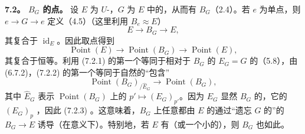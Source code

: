 \textbf{7.2。 $B_G$ 的点。} 设 $E$ 为 $U$-，$G$ 为 $E$ 中的，从而有 $B_G$（2.4）。若 $e$ 为单点，则 $e\to G\to e$ 定义（4.5）（这里利用 $B_e\approx E$）
\[E\longrightarrow B_G\longrightarrow E,\tag{7.2.1}\]
其复合于 $\operatorname{id}_E$。因此取点得到
\[\operatorname{Point}(E)\longrightarrow\operatorname{Point}(B_G)\longrightarrow\operatorname{Point}(E),\tag{7.2.2}\]
其复合于恒等。利用 (7.2.1) 的第一个等同于相对于 $B_G$ 的 $E_G=G$ 的（5.8），由 (6.7.2)，(7.2.2) 的第一个等同于自然的“包含”
\[\operatorname{Point}(B_G)_{/\widehat E_G}\longrightarrow\operatorname{Point}(B_G),\tag{7.2.3}\]
其中 $\widehat E_G$ 表示 $\operatorname{Point}(B_G)$ 上的 $p'\mapsto(E_G)_{p'}$。因为 $E_G$ 显然 $B_G$ 的，它的 $(E_G)_p$ ，因此 (7.2.3) 。这意味着，$B_G$ 上任意都由 $E$ 的通过“遗忘 $G$ 的”的 $B_G\to E$ 诱导（在意义下）。特别地，若 $E$ 有（或一个小的），则 $B_G$ 也如此。

